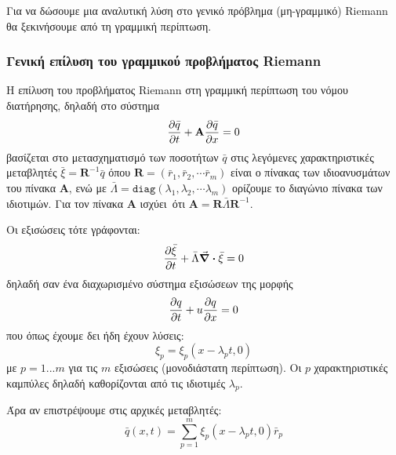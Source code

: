 Για να δώσουμε μια αναλυτική λύση στο γενικό πρόβλημα (μη-γραμμικό) Riemann θα ξεκινήσουμε από τη γραμμική περίπτωση.

\subsubsection{Γενική επίλυση του γραμμικού προβλήματος Riemann}
Η επίλυση του προβλήματος Riemann στη γραμμική περίπτωση του νόμου διατήρησης, δηλαδή στο σύστημα
\begin{equation}
\pdv{\bar{q}}{t} +  \mathbf{A}\pdv{\bar{q}}{x}  = 0 
\end{equation}
 βασίζεται στο μετασχηματισμό των ποσοτήτων $\bar{q}$ στις λεγόμενες χαρακτηριστικές μεταβλητές $\bar{\xi}=\mathbf{R}^{-1}\bar{q}$ όπου $\mathbf{R}=(\bar{r}_1,\bar{r}_2,\cdots \bar{r}_m)$ είναι ο πίνακας των ιδιοανυσμάτων του πίνακα $\mathbf{A}$, ενώ με $\bar{\Lambda}=\mathtt{diag}(\lambda _1,\lambda _2,\cdots \lambda _m)$ ορίζουμε το διαγώνιο πίνακα των ιδιοτιμών. Για τον πίνακα $\mathbf{A}$ ισχύει\ ότι $\mathbf{A}=\mathbf{R}\bar{\Lambda}\mathbf{R}^{-1}$.

Οι εξισώσεις τότε γράφονται:
\begin{equation}
\pdv{\bar{\xi}}{t} + \bar{\Lambda} \div\bar{\xi} =0
\end{equation} 
δηλαδή σαν ένα διαχωρισμένο σύστημα εξισώσεων της μορφής 
\begin{equation}
\pdv{q}{t} +  u\pdv{q}{x}  = 0 
\end{equation} που όπως έχουμε δει ήδη έχουν λύσεις:
\begin{equation}
\label{eq:xi_solution}
\xi_p  = \xi_p(x-\lambda _p t,0) 
\end{equation}
με $p=1...m$ για τις $m$ εξισώσεις (μονοδιάστατη περίπτωση). Οι $p$ χαρακτηριστικές καμπύλες δηλαδή καθορίζονται από τις ιδιοτιμές $\lambda _p$.

Άρα αν επιστρέψουμε στις αρχικές μεταβλητές:
\begin{equation}
\bar{q}(x,t) = \sum_{p=1}^{m} \xi_p(x-\lambda _p t,0)\bar{r}_p
\end{equation}

